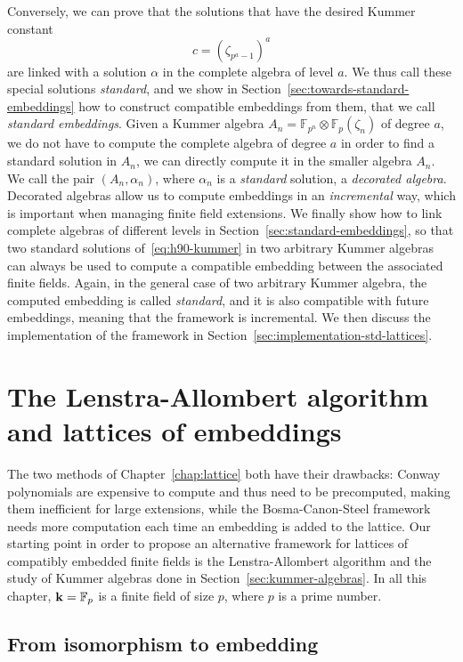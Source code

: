 Conversely, we can prove that the solutions that have the desired Kummer
constant 
\[
  c = (\zeta_{p^a-1})^a
\]
are linked with a solution $\alpha$ in the complete algebra of level $a$.
We thus call these special solutions \emph{standard}, and we show in
Section~\ref{sec:towards-standard-embeddings} how to construct compatible
embeddings from them, that we call \emph{standard embeddings}. Given a Kummer
algebra $A_n = \mathbb{F}_{p^{n}}\otimes \mathbb{F}_{p}(\zeta_n)$ of degree $a$,
we do not have to compute the complete algebra of degree $a$ in order to find a
standard solution in $A_n$, we can directly compute it in the smaller algebra
$A_n$. We call the pair $(A_n, \alpha_n)$, where $\alpha_n$ is a \emph{standard}
solution, a \emph{decorated algebra}. Decorated algebras allow us to compute
embeddings in an \emph{incremental} way, which is important when managing
finite field extensions. We finally show how to link complete algebras of
different levels in Section~\ref{sec:standard-embeddings}, so that two standard
solutions of~\eqref{eq:h90-kummer} in two arbitrary Kummer algebras can always
be used to compute a compatible embedding between the associated finite fields.
Again, in the general case of two arbitrary Kummer algebra, the computed
embedding is called \emph{standard}, and it is also compatible with future
embeddings, meaning that the framework is incremental. We then discuss the
implementation of the framework in
Section~\ref{sec:implementation-std-lattices}.

\section{The Lenstra-Allombert algorithm and lattices of embeddings}
\label{sec:lenstra-allombert-embeddings}

The two methods of Chapter~\ref{chap:lattice} both have their drawbacks: Conway
polynomials are expensive to compute and thus need to be precomputed, making
them inefficient for large extensions, while the Bosma-Canon-Steel framework
needs more computation each time an embedding is added to the lattice.
Our starting point in order to propose an alternative framework for lattices of
compatibly embedded finite fields is the Lenstra-Allombert algorithm and the
study of Kummer algebras done in Section~\ref{sec:kummer-algebras}. In all this
chapter, $\mathbf{k}=\mathbb{F}_p$ is a finite field of size $p$, where
$p$ is a prime number.

\subsection{From isomorphism to embedding}
\label{sec:iso-to-emb}

